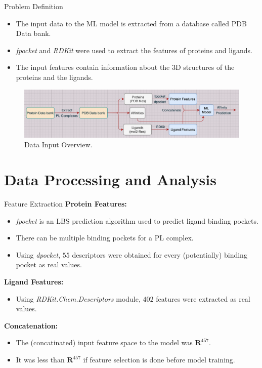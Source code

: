 \documentclass{beamer}
\begin{document}
\begin{frame}[t]{Problem Definition}

\begin{itemize}
\item The input data to the ML model is extracted from a database called PDB Data bank.
\item \textit{fpocket} and \textit{RDKit} were used to extract the features of proteins and ligands.
\item The input features contain information about the 3D structures of the proteins and the ligands.
\end{itemize}

\begin{figure}[htb]
  \centering
    \includegraphics[scale=0.46]{images/DataInputOverview}
    \caption{Data Input Overview.}
    \label{fig:projectoverviewimage}
\end{figure}


\end{frame}

\section{Data Processing and Analysis}

\begin{frame}[t]{Feature Extraction}
\textbf{Protein Features:}
\begin{itemize}
\item \textit{fpocket} is an LBS prediction algorithm used to predict ligand binding pockets.
\item There can be multiple binding pockets for a PL complex.
\item Using \textit{dpocket},  $55$ descriptors were obtained for every (potentially) binding pocket as real values.
\end{itemize}

\textbf{Ligand Features:}
\begin{itemize}
\item Using \textit{RDKit.Chem.Descriptors} module,  $402$ features were extracted as real values.
\end{itemize}

\textbf{Concatenation:}
\begin{itemize}
\item The (concatinated) input feature space to the model was $\mathbf{R}^{457}$.
\item It was less than $\mathbf{R}^{457}$ if feature selection is done before model training.
\end{itemize}

\end{frame}
\end{document}
